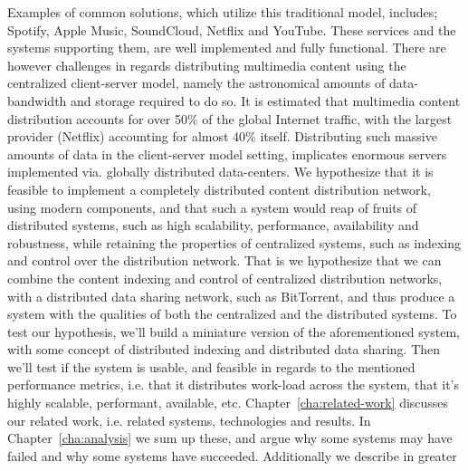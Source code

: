 Examples of common solutions, which utilize this traditional model, includes;
Spotify, Apple Music, SoundCloud, Netflix and YouTube.
\newline
These services and the systems supporting them, are well implemented and
fully functional. There are however challenges in regards distributing
multimedia content using the centralized client-server model, namely the 
astronomical amounts of data-bandwidth and storage required to do so.
\newline
It is estimated that multimedia content distribution accounts for over 50\% of
the global Internet traffic, with the largest provider (Netflix) accounting for
almost 40\% itself\citep{sandvine:2015}.
\newline
Distributing such massive amounts of data in the client-server model setting, 
implicates enormous servers implemented via. globally distributed data-centers.
\newline\newline
We hypothesize that it is feasible to implement a completely distributed
content distribution network, using modern components, and that such a system
would reap of fruits of distributed systems, such as high scalability, 
performance, availability and robustness, while retaining the properties of 
centralized systems, such as indexing and control over the distribution network.
\newline
That is we hypothesize that we can combine the content indexing and control of
centralized distribution networks, with a distributed data sharing network,
such as BitTorrent, and thus produce a system with the qualities of both the
centralized and the distributed systems.
\newline\newline
To test our hypothesis, we'll build a miniature version of the aforementioned
system, with some concept of distributed indexing and distributed data
sharing.
\newline
Then we'll test if the system is usable, and feasible in regards to the
mentioned performance metrics, i.e. that it distributes work-load across the
system, that it's highly scalable, performant, available, etc.
\newline\newline
Chapter~\ref{cha:related-work} discusses our related work, i.e. related systems,
technologies and results.
In Chapter~\ref{cha:analysis} we sum up these, and argue why some systems may have
failed and why some systems have succeeded. Additionally we describe in greater
